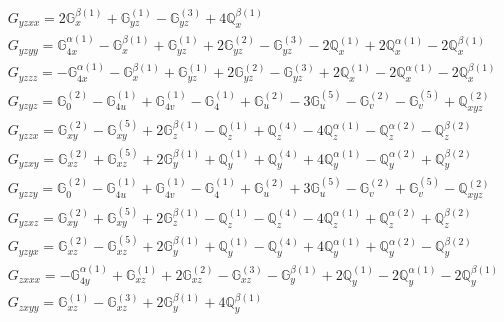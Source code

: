 \documentclass[fleqn,8pt,landscape]{jsarticle}
\begin{document}
\begin{align*}
& G_{yzxx} = 2 \mathbb{G}_{x}^{\beta(1)} + \mathbb{G}_{yz}^{(1)} - \mathbb{G}_{yz}^{(3)} + 4 \mathbb{Q}_{x}^{\beta(1)} \\
& G_{yzyy} = \mathbb{G}_{4x}^{\alpha(1)} - \mathbb{G}_{x}^{\beta(1)} + \mathbb{G}_{yz}^{(1)} + 2 \mathbb{G}_{yz}^{(2)} - \mathbb{G}_{yz}^{(3)} - 2 \mathbb{Q}_{x}^{(1)} + 2 \mathbb{Q}_{x}^{\alpha(1)} - 2 \mathbb{Q}_{x}^{\beta(1)} \\
& G_{yzzz} = - \mathbb{G}_{4x}^{\alpha(1)} - \mathbb{G}_{x}^{\beta(1)} + \mathbb{G}_{yz}^{(1)} + 2 \mathbb{G}_{yz}^{(2)} - \mathbb{G}_{yz}^{(3)} + 2 \mathbb{Q}_{x}^{(1)} - 2 \mathbb{Q}_{x}^{\alpha(1)} - 2 \mathbb{Q}_{x}^{\beta(1)} \\
& G_{yzyz} = \mathbb{G}_{0}^{(2)} - \mathbb{G}_{4u}^{(1)} + \mathbb{G}_{4v}^{(1)} - \mathbb{G}_{4}^{(1)} + \mathbb{G}_{u}^{(2)} - 3 \mathbb{G}_{u}^{(5)} - \mathbb{G}_{v}^{(2)} - \mathbb{G}_{v}^{(5)} + \mathbb{Q}_{xyz}^{(2)} \\
& G_{yzzx} = \mathbb{G}_{xy}^{(2)} - \mathbb{G}_{xy}^{(5)} + 2 \mathbb{G}_{z}^{\beta(1)} - \mathbb{Q}_{z}^{(1)} + \mathbb{Q}_{z}^{(4)} - 4 \mathbb{Q}_{z}^{\alpha(1)} - \mathbb{Q}_{z}^{\alpha(2)} - \mathbb{Q}_{z}^{\beta(2)} \\
& G_{yzxy} = \mathbb{G}_{xz}^{(2)} + \mathbb{G}_{xz}^{(5)} + 2 \mathbb{G}_{y}^{\beta(1)} + \mathbb{Q}_{y}^{(1)} + \mathbb{Q}_{y}^{(4)} + 4 \mathbb{Q}_{y}^{\alpha(1)} - \mathbb{Q}_{y}^{\alpha(2)} + \mathbb{Q}_{y}^{\beta(2)} \\
& G_{yzzy} = \mathbb{G}_{0}^{(2)} - \mathbb{G}_{4u}^{(1)} + \mathbb{G}_{4v}^{(1)} - \mathbb{G}_{4}^{(1)} + \mathbb{G}_{u}^{(2)} + 3 \mathbb{G}_{u}^{(5)} - \mathbb{G}_{v}^{(2)} + \mathbb{G}_{v}^{(5)} - \mathbb{Q}_{xyz}^{(2)} \\
& G_{yzxz} = \mathbb{G}_{xy}^{(2)} + \mathbb{G}_{xy}^{(5)} + 2 \mathbb{G}_{z}^{\beta(1)} - \mathbb{Q}_{z}^{(1)} - \mathbb{Q}_{z}^{(4)} - 4 \mathbb{Q}_{z}^{\alpha(1)} + \mathbb{Q}_{z}^{\alpha(2)} + \mathbb{Q}_{z}^{\beta(2)} \\
& G_{yzyx} = \mathbb{G}_{xz}^{(2)} - \mathbb{G}_{xz}^{(5)} + 2 \mathbb{G}_{y}^{\beta(1)} + \mathbb{Q}_{y}^{(1)} - \mathbb{Q}_{y}^{(4)} + 4 \mathbb{Q}_{y}^{\alpha(1)} + \mathbb{Q}_{y}^{\alpha(2)} - \mathbb{Q}_{y}^{\beta(2)} \\
& G_{zxxx} = - \mathbb{G}_{4y}^{\alpha(1)} + \mathbb{G}_{xz}^{(1)} + 2 \mathbb{G}_{xz}^{(2)} - \mathbb{G}_{xz}^{(3)} - \mathbb{G}_{y}^{\beta(1)} + 2 \mathbb{Q}_{y}^{(1)} - 2 \mathbb{Q}_{y}^{\alpha(1)} - 2 \mathbb{Q}_{y}^{\beta(1)} \\
& G_{zxyy} = \mathbb{G}_{xz}^{(1)} - \mathbb{G}_{xz}^{(3)} + 2 \mathbb{G}_{y}^{\beta(1)} + 4 \mathbb{Q}_{y}^{\beta(1)} \\

\end{align*}
\end{document}
